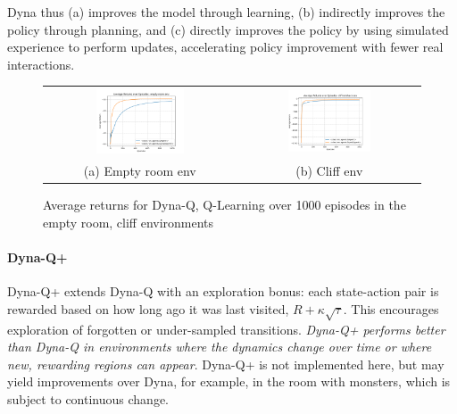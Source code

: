 \documentclass[12pt]{article}
\begin{document}
Dyna thus
(a) improves the model through learning,
(b) indirectly improves the policy through planning, and
(c) directly improves the policy by using simulated experience to perform updates,
accelerating policy improvement with fewer real interactions.

\begin{figure}[!h]
	\centering
	\begin{tabular}{cc}
		\includegraphics[width=0.48\textwidth]{figures/dyna-q-empty-room.png} &
		\includegraphics[width=0.48\textwidth]{figures/dyna-q-cliff.png}                      \\
		(a) Empty room env                                                    & (b) Cliff env
	\end{tabular}
	\caption{Average returns for Dyna-Q, Q-Learning over 1000 episodes in the empty room, cliff environments}
	\label{fig:dyna-q}
\end{figure}

\paragraph{Dyna-Q+}

Dyna-Q+ extends Dyna-Q with an exploration bonus:
each state-action pair is rewarded based on how long ago it was last visited, $R + \kappa \sqrt{\tau}$.
This encourages exploration of forgotten or under-sampled transitions.
\textit{Dyna-Q+ performs better than Dyna-Q in environments where the dynamics change over time or where new, rewarding regions can appear}.
Dyna-Q+ is not implemented here,
but may yield improvements over Dyna, for example, in the room with monsters, which is subject to continuous change.
\end{document}
